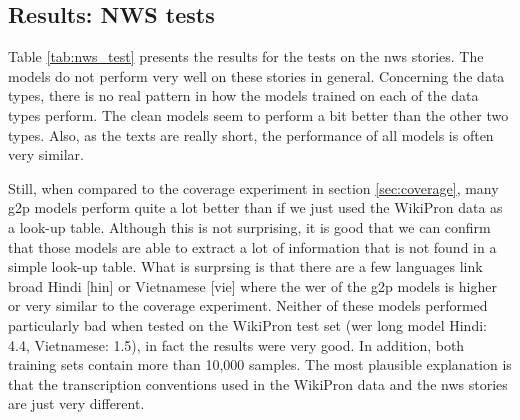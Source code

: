 
\subsection{Results: NWS tests}
Table \ref{tab:nws_test} presents the results for the tests on the \ac{nws} stories. The models do not perform very well on these stories in general. Concerning the data types, there is no real pattern in how the models trained on each of the data types perform. The clean models seem to perform a bit better than the other two types. Also, as the texts are really short, the performance of all models is often very similar.

Still, when compared to the coverage experiment in section \ref{sec:coverage}, many \ac{g2p} models perform quite a lot better than if we just used the WikiPron data as a look-up table. Although this is not surprising, it is good that we can confirm that those models are able to extract a lot of information that is not found in a simple look-up table. What is surprsing is that there are a few languages link broad Hindi [hin] or Vietnamese [vie] where the \ac{wer} of the \ac{g2p} models is higher or very similar to the coverage experiment. Neither of these models performed particularly bad when tested on the WikiPron test set (\ac{wer} long model Hindi: 4.4, Vietnamese: 1.5), in fact the results were very good. In addition, both training sets contain more than 10,000 samples. The most plausible explanation is that the transcription conventions used in the WikiPron data and the \ac{nws} stories are just very different.  

